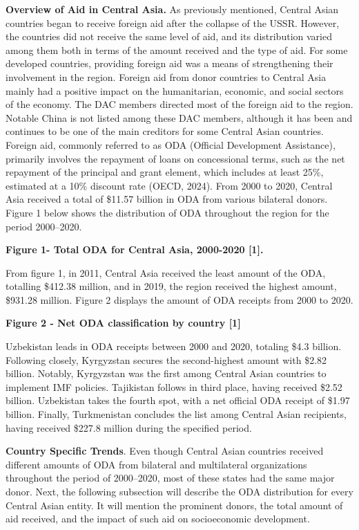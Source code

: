{\bfseries Overview of Aid in Central Asia}{\bfseries .} As previously
mentioned, Central Asian countries began to receive foreign aid after
the collapse of the USSR. However, the countries did not receive the
same level of aid, and its distribution varied among them both in terms
of the amount received and the type of aid. For some developed
countries, providing foreign aid was a means of strengthening their
involvement in the region. Foreign aid from donor countries to Central
Asia mainly had a positive impact on the humanitarian, economic, and
social sectors of the economy. The DAC members directed most of the
foreign aid to the region. Notable China is not listed among these DAC
members, although it has been and continues to be one of the main
creditors for some Central Asian countries. Foreign aid, commonly
referred to as ODA (Official Development Assistance), primarily involves
the repayment of loans on concessional terms, such as the net repayment
of the principal and grant element, which includes at least 25\%,
estimated at a 10\% discount rate (OECD, 2024). From 2000 to 2020,
Central Asia received a total of \$11.57 billion in ODA from various
bilateral donors. Figure 1 below shows the distribution of ODA
throughout the region for the period 2000--2020.

{\bfseries Figure 1- Total ODA for Central Asia, 2000-2020 {[}1{]}.}

From figure 1, in 2011, Central Asia received the least amount of the
ODA, totalling \$412.38 million, and in 2019, the region received the
highest amount, \$931.28 million. Figure 2 displays the amount of ODA
receipts from 2000 to 2020.

{\bfseries Figure 2 - Net ODA classification by country {[}1{]}}

Uzbekistan leads in ODA receipts between 2000 and 2020, totaling \$4.3
billion. Following closely, Kyrgyzstan secures the second-highest amount
with \$2.82 billion. Notably, Kyrgyzstan was the first among Central
Asian countries to implement IMF policies. Tajikistan follows in third
place, having received \$2.52 billion. Uzbekistan takes the fourth spot,
with a net official ODA receipt of \$1.97 billion. Finally, Turkmenistan
concludes the list among Central Asian recipients, having received
\$227.8 million during the specified period.

{\bfseries Country Specific Trends}. Even though Central Asian countries
received different amounts of ODA from bilateral and multilateral
organizations throughout the period of 2000--2020, most of these states
had the same major donor. Next, the following subsection will describe
the ODA distribution for every Central Asian entity. It will mention the
prominent donors, the total amount of aid received, and the impact of
such aid on socioeconomic development.

